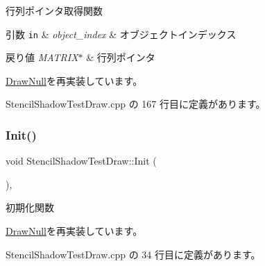 行列ポインタ取得関数 


\begin{DoxyParams}[1]{引数}
\mbox{\tt in}  & {\em object\+\_\+index} & オブジェクトインデックス \\
\hline
\end{DoxyParams}

\begin{DoxyRetVals}{戻り値}
{\em M\+A\+T\+R\+I\+X$\ast$} & 行列ポインタ \\
\hline
\end{DoxyRetVals}


\mbox{\hyperlink{class_draw_null_a9aac059eb3b5d1f77e8bd3aa0647cff9}{Draw\+Null}}を再実装しています。



 Stencil\+Shadow\+Test\+Draw.\+cpp の 167 行目に定義があります。

\mbox{\label{class_stencil_shadow_test_draw_a65be72e71cd12cacf315b0364c12c3e3}} 
\subsubsection{\texorpdfstring{Init()}{Init()}}
{\footnotesize\ttfamily void Stencil\+Shadow\+Test\+Draw\+::\+Init (\begin{DoxyParamCaption}{ }\end{DoxyParamCaption})\hspace{0.3cm}{\ttfamily [override]}, {\ttfamily [virtual]}}



初期化関数 



\mbox{\hyperlink{class_draw_null_a20aef1e54c1a158b741bfd731e18efdf}{Draw\+Null}}を再実装しています。



 Stencil\+Shadow\+Test\+Draw.\+cpp の 34 行目に定義があります。

\mbox{\label{class_stencil_shadow_test_draw_a68917115d3f151ed91ce297924ee5bbb}} 
